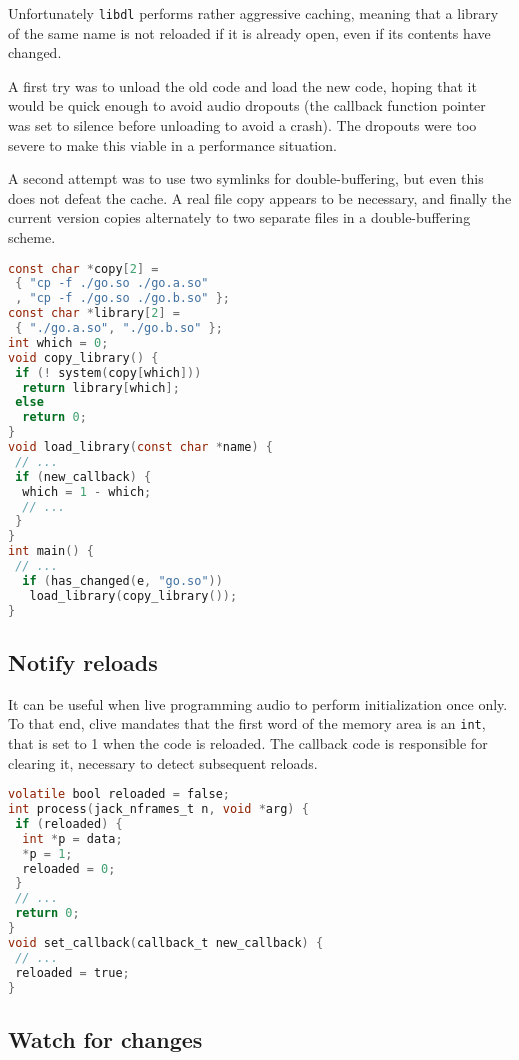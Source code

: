 \documentclass[11pt,a4paper]{article}
\begin{document}
Unfortunately \lstinline!libdl! performs rather aggressive caching,
meaning that a library of the same name is not reloaded if it is already
open, even if its contents have changed.

A first try was to unload the old code and load the new code, hoping
that it would be quick enough to avoid audio dropouts (the callback
function pointer was set to silence before unloading to avoid a crash).
The dropouts were too severe to make this viable in a performance
situation.

A second attempt was to use two symlinks for double-buffering, but even
this does not defeat the cache. A real file copy appears to be
necessary, and finally the current version copies alternately to two
separate files in a double-buffering scheme.

\begin{lstlisting}[language=C, caption={Defeating caches by copying}, label=lcache]
const char *copy[2] =
 { "cp -f ./go.so ./go.a.so"
 , "cp -f ./go.so ./go.b.so" };
const char *library[2] =
 { "./go.a.so", "./go.b.so" };
int which = 0;
void copy_library() {
 if (! system(copy[which]))
  return library[which];
 else
  return 0;
}
void load_library(const char *name) {
 // ...
 if (new_callback) {
  which = 1 - which;
  // ...
 }
}
int main() {
 // ...
  if (has_changed(e, "go.so"))
   load_library(copy_library());
}
\end{lstlisting}

\subsection{Notify reloads}\label{notify-reloads}

It can be useful when live programming audio to perform initialization
once only. To that end, clive mandates that the first word of the memory
area is an \lstinline!int!, that is set to 1 when the code is reloaded.
The callback code is responsible for clearing it, necessary to detect
subsequent reloads.

\begin{lstlisting}[language=C, caption={Reload notification}, label=lreload]
volatile bool reloaded = false;
int process(jack_nframes_t n, void *arg) {
 if (reloaded) {
  int *p = data;
  *p = 1;
  reloaded = 0;
 }
 // ...
 return 0;
}
void set_callback(callback_t new_callback) {
 // ...
 reloaded = true;
}
\end{lstlisting}

\subsection{Watch for changes}\label{watch-for-changes}
\end{document}
